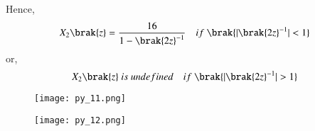 \documentclass[beamer]{IEEEtran}
\theoremstyle{remark}
\begin{document}
Hence,
$$X_2\brak{z}=\frac{16}{1-{\brak{2z}^{-1}}}\quad if\ \brak{|{\brak{2z}^{-1}}|<1}$$
or,
$$X_2\brak{z}\ is\ undefined\quad if\ \brak{|{\brak{2z}^{-1}}|>1}$$
\begin{figure}[h]
    \centering
    \texttt{[image: py\_11.png]}
    \label{fig:enter-label}
\end{figure}
\begin{figure}[h]
    \centering
    \texttt{[image: py\_12.png]}
    \label{fig:enter-label}
\end{figure}
\end{document}
